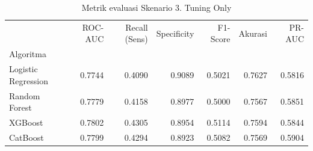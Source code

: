 \begin{table}[htbp]
\caption{Metrik evaluasi Skenario 3. Tuning Only}
\label{tab:ablasi3}
\begin{tabular}{lrrrrrr}
\toprule
 & ROC-AUC & Recall (Sens) & Specificity & F1-Score & Akurasi & PR-AUC \\
Algoritma &  &  &  &  &  &  \\
\midrule
Logistic Regression & 0.7744 & 0.4090 & 0.9089 & 0.5021 & 0.7627 & 0.5816 \\
Random Forest & 0.7779 & 0.4158 & 0.8977 & 0.5000 & 0.7567 & 0.5851 \\
XGBoost & 0.7802 & 0.4305 & 0.8954 & 0.5114 & 0.7594 & 0.5844 \\
CatBoost & 0.7799 & 0.4294 & 0.8923 & 0.5082 & 0.7569 & 0.5904 \\
\bottomrule
\end{tabular}
\end{table}
